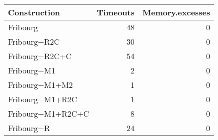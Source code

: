 \begin{table}[ht]
\centering
\begin{tabular}{lrr}
  \hline
Construction & Timeouts & Memory.excesses \\ 
  \hline
Fribourg & 48 & 0 \\ 
  Fribourg+R2C & 30 & 0 \\ 
  Fribourg+R2C+C & 54 & 0 \\ 
  Fribourg+M1 & 2 & 0 \\ 
  Fribourg+M1+M2 & 1 & 0 \\ 
  Fribourg+M1+R2C & 1 & 0 \\ 
  Fribourg+M1+R2C+C & 8 & 0 \\ 
  Fribourg+R & 24 & 0 \\ 
   \hline
\end{tabular}
\end{table}
